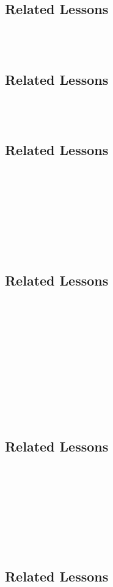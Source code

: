 \subsection{Related Lessons} 
\fourbThree{}\\ 
\fourjNine{}\\
\subsection{Related Lessons} 
\fourbThree{}\\ 
\fourjNine{}\\
%
\subsection{Related Lessons}
\fourbFour{}\\
\fourbFive{}\\
\fourbSeven{}\\
\fourbNine{}\\
\fourbEleven{}\\ 
\fourhFour{}\\
\fouriOne{}\\
%
\subsection{Related Lessons}
\fourbThree{}\\
\fourbFour{}\\
\fourbEight{}\\
\fourbNine{}\\
\fourbTen{}\\
\fourbEleven{}\\
\foureOne{}\\
\fourhThree{}\\
\fouriFive{}\\
\fourFKThirtyThree{}\\
%
\subsection{Related Lessons}
\fourbThree{}\\
\fourbSeven{}\\
\fourhOne{}\\
\fourhTwo{}\\
\fourhFour{}\\
\fouriFive{}\\
\fourFKThirtySix{}\\
%
\subsection{Related Lessons}
\fourbThree{}\\
\fourbSeven{}\\
\fourhOne{}\\
\fouriFive{}\\
\fourbFour{}\\
\fourbFive{}\\
\fourbSix{}\\
\fourbSeven{}\\
\fourbEight{}\\
\fourbNine{}\\
\fourbTen{}\\
